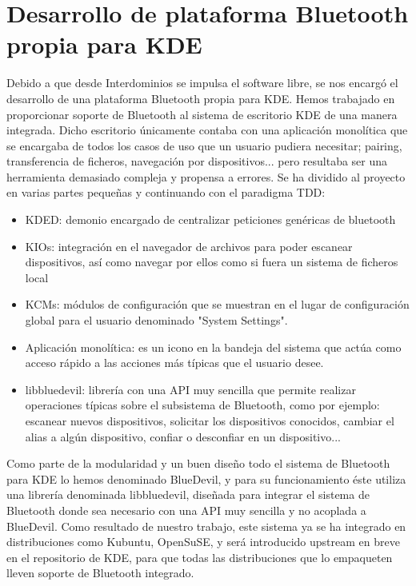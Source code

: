 \documentclass[12pt]{article}
\begin{document}
  \section{Desarrollo de plataforma Bluetooth propia para KDE}
    Debido a que desde Interdominios se impulsa el software libre, se nos encargó el desarrollo de
    una plataforma Bluetooth propia para KDE.
    Hemos trabajado en proporcionar soporte de Bluetooth al sistema de escritorio KDE de una manera
    integrada. Dicho escritorio únicamente contaba con una aplicación monolítica que se encargaba de
    todos los casos de uso que un usuario pudiera necesitar; pairing, transferencia de ficheros,
    navegación por dispositivos... pero resultaba ser una herramienta demasiado compleja y propensa
    a errores.
    Se ha dividido al proyecto en varias partes pequeñas y continuando con el paradigma TDD:
    \begin{itemize}
      \item KDED: demonio encargado de centralizar peticiones genéricas de bluetooth
      \item KIOs: integración en el navegador de archivos para poder escanear dispositivos, así como
                  navegar por ellos como si fuera un sistema de ficheros local
      \item KCMs: módulos de configuración que se muestran en el lugar de configuración global para
                  el usuario denominado "System Settings".
      \item Aplicación monolítica: es un icono en la bandeja del sistema que actúa como acceso
            rápido a las acciones más típicas que el usuario desee.
      \item libbluedevil: librería con una API muy sencilla que permite realizar operaciones típicas
                          sobre el subsistema de Bluetooth, como por ejemplo: escanear nuevos
                          dispositivos, solicitar los dispositivos conocidos, cambiar el alias a
                          algún dispositivo, confiar o desconfiar en un dispositivo...
    \end{itemize}
    Como parte de la modularidad y un buen diseño todo el sistema de Bluetooth para KDE lo hemos
    denominado BlueDevil, y para su funcionamiento éste utiliza una librería denominada
    libbluedevil, diseñada para integrar el sistema de Bluetooth donde sea necesario con una API muy
    sencilla y no acoplada a BlueDevil. Como resultado de nuestro trabajo, este sistema ya se ha
    integrado en distribuciones como Kubuntu, OpenSuSE, y será introducido upstream en breve en el
    repositorio de KDE, para que todas las distribuciones que lo empaqueten lleven soporte de
    Bluetooth integrado.
\end{document}
